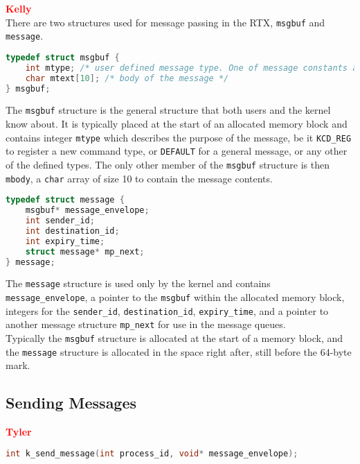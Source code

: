 \documentclass[12pt]{report}
\begin{document}
\textcolor{red}{\textbf{Kelly}} \\
There are two structures used for message passing in the RTX, \texttt{msgbuf} and
\texttt{message}. \\
\begin{lstlisting}[language=C, frame=single]
typedef struct msgbuf {
	int mtype; /* user defined message type. One of message constants above  */
	char mtext[10]; /* body of the message */
} msgbuf;
\end{lstlisting}
The \texttt{msgbuf} structure is the general structure that both users and the
kernel know about. It is typically placed at the start of an allocated memory block
and contains integer \texttt{mtype} which describes the purpose of the message, be it
\texttt{KCD_REG} to register a new command type, or \texttt{DEFAULT} for a general
message, or any other of the defined types. The only other member of the \texttt{msgbuf}
structure is then \texttt{mbody}, a \texttt{char} array of size 10 to contain the 
message contents. \\
\begin{lstlisting}[language=C, frame=single]
typedef struct message {
	msgbuf* message_envelope;
	int sender_id;
	int destination_id;
	int expiry_time;
	struct message* mp_next;
} message;
\end{lstlisting}
The \texttt{message} structure is used only by the kernel and contains \texttt{message_envelope},
a pointer to the \texttt{msgbuf} within the allocated memory block, integers for the
\texttt{sender_id}, \texttt{destination_id}, \texttt{expiry_time}, and a pointer 
to another message structure \texttt{mp_next} for use in the message queues. \\
Typically the \texttt{msgbuf} structure is allocated at the start of a memory block,
and the \texttt{message} structure is allocated in the space right after, still before
the 64-byte mark.


\subsection{Sending Messages}

\textcolor{red}{\textbf{Tyler}} \\
\begin{minipage}{\textwidth}
\begin{lstlisting}[language=C, frame=single]
int k_send_message(int process_id, void* message_envelope);
\end{lstlisting}
\end{minipage}
\end{document}
